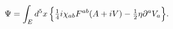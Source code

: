 \begin{equation*}
\Psi = \int_E d^5x\, \Bigr\{
\hbox{$\frac{1}{4}$} i \chi_{ab} F^{ab}( A + i V ) -
\hbox{$\frac{1}{2}$} \eta \partial^a V_a \Bigr\}.
\end{equation*}

